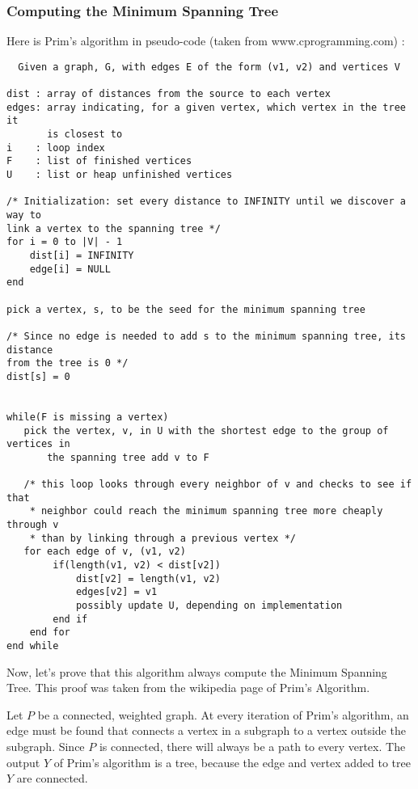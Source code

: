 \documentclass[11pt]{article}
\begin{document}
\subsubsection{Computing the Minimum Spanning Tree}

Here is Prim's algorithm in pseudo-code (taken from www.cprogramming.com) :

\begin{lstlisting}
  Given a graph, G, with edges E of the form (v1, v2) and vertices V

dist : array of distances from the source to each vertex
edges: array indicating, for a given vertex, which vertex in the tree it 
       is closest to
i    : loop index
F    : list of finished vertices
U    : list or heap unfinished vertices

/* Initialization: set every distance to INFINITY until we discover a way to
link a vertex to the spanning tree */
for i = 0 to |V| - 1
    dist[i] = INFINITY
    edge[i] = NULL
end

pick a vertex, s, to be the seed for the minimum spanning tree

/* Since no edge is needed to add s to the minimum spanning tree, its distance
from the tree is 0 */
dist[s] = 0


while(F is missing a vertex)
   pick the vertex, v, in U with the shortest edge to the group of vertices in
       the spanning tree add v to F

   /* this loop looks through every neighbor of v and checks to see if that
    * neighbor could reach the minimum spanning tree more cheaply through v
    * than by linking through a previous vertex */
   for each edge of v, (v1, v2)
        if(length(v1, v2) < dist[v2])
            dist[v2] = length(v1, v2)
            edges[v2] = v1
            possibly update U, depending on implementation
        end if
    end for
end while

\end{lstlisting}

Now, let's prove that this algorithm always compute the Minimum Spanning Tree.
This proof was taken from the wikipedia page of Prim's Algorithm.

Let $P$ be a connected, weighted graph. At every iteration of Prim's algorithm, an edge must be found that connects a vertex in a subgraph to a 
vertex outside the subgraph. Since $P$ is connected, there will always be a path to every vertex. The output $Y$ of Prim's algorithm 
is a tree, because the edge and vertex added to tree $Y$ are connected. 
\end{document}
